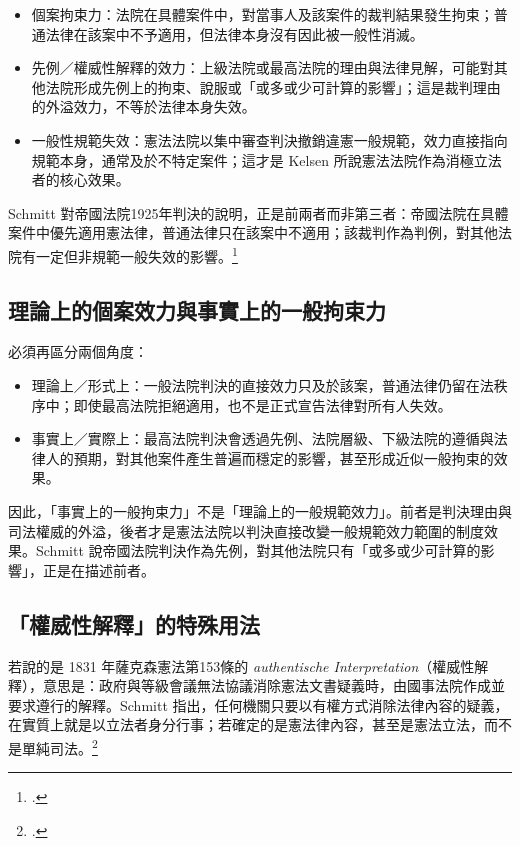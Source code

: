 \begin{itemize}
\tightlist
\item
  個案拘束力：法院在具體案件中，對當事人及該案件的裁判結果發生拘束；普通法律在該案中不予適用，但法律本身沒有因此被一般性消滅。
\item
  先例／權威性解釋的效力：上級法院或最高法院的理由與法律見解，可能對其他法院形成先例上的拘束、說服或「或多或少可計算的影響」；這是裁判理由的外溢效力，不等於法律本身失效。
\item
  一般性規範失效：憲法法院以集中審查判決撤銷違憲一般規範，效力直接指向規範本身，通常及於不特定案件；這才是 Kelsen 所說憲法法院作為消極立法者的核心效果。
\end{itemize}

Schmitt 對帝國法院1925年判決的說明，正是前兩者而非第三者：帝國法院在具體案件中優先適用憲法律，普通法律只在該案中不適用；該裁判作為判例，對其他法院有一定但非規範一般失效的影響。\footcites[83, 88--89]{schmitt2015}[16, 20]{schmitt1931}

\subsection{理論上的個案效力與事實上的一般拘束力}

必須再區分兩個角度：

\begin{itemize}
\tightlist
\item
  理論上／形式上：一般法院判決的直接效力只及於該案，普通法律仍留在法秩序中；即使最高法院拒絕適用，也不是正式宣告法律對所有人失效。
\item
  事實上／實際上：最高法院判決會透過先例、法院層級、下級法院的遵循與法律人的預期，對其他案件產生普遍而穩定的影響，甚至形成近似一般拘束的效果。
\end{itemize}

因此，「事實上的一般拘束力」不是「理論上的一般規範效力」。前者是判決理由與司法權威的外溢，後者才是憲法法院以判決直接改變一般規範效力範圍的制度效果。Schmitt 說帝國法院判決作為先例，對其他法院只有「或多或少可計算的影響」，正是在描述前者。

\subsection{「權威性解釋」的特殊用法}

若說的是 1831 年薩克森憲法第153條的 \emph{authentische Interpretation}（權威性解釋），意思是：政府與等級會議無法協議消除憲法文書疑義時，由國事法院作成並要求遵行的解釋。Schmitt 指出，任何機關只要以有權方式消除法律內容的疑義，在實質上就是以立法者身分行事；若確定的是憲法律內容，甚至是憲法立法，而不是單純司法。\footcites[117]{schmitt2015}[45]{schmitt1931}

